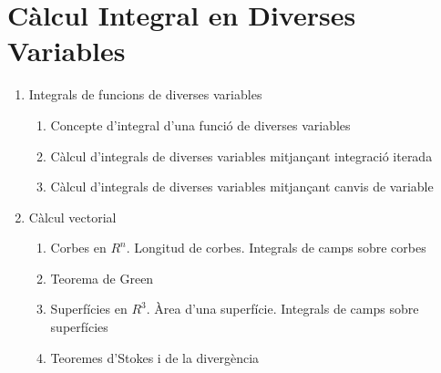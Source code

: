 \documentclass{article}
\begin{document}
\section{Càlcul Integral en Diverses Variables}
\begin{enumerate}
 \item Integrals de funcions de diverses variables
	\begin{enumerate}
 	\item Concepte d’integral d’una funció de diverses variables
 	\item Càlcul d’integrals de diverses variables mitjançant integració iterada
 	\item Càlcul d’integrals de diverses variables mitjançant canvis de variable
	\end{enumerate}
 \item Càlcul vectorial
	\begin{enumerate}
 	\item Corbes en $R^n$. Longitud de corbes. Integrals de camps sobre corbes
 	\item Teorema de Green 
 	\item Superfícies en $R^3$. Àrea d’una superfície. Integrals de camps sobre superfícies
 	\item Teoremes d’Stokes i de la divergència
	\end{enumerate}
\end{enumerate}
\newpage
\end{document}
